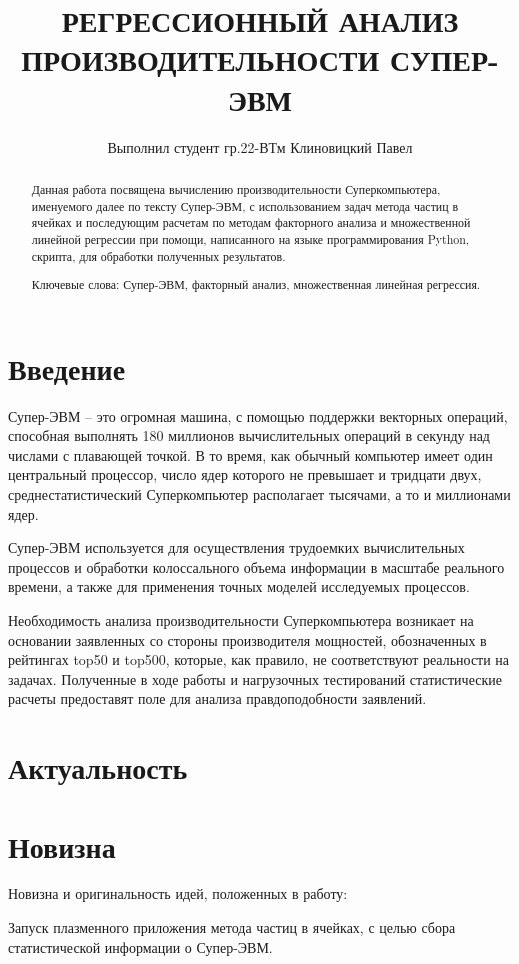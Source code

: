 \documentclass{article}
\title{РЕГРЕССИОННЫЙ АНАЛИЗ ПРОИЗВОДИТЕЛЬНОСТИ СУПЕР-ЭВМ}
\author{Выполнил студент гр.22-ВТм Клиновицкий Павел}
\begin{document}
\maketitle

\begin{abstract}
Данная работа посвящена вычислению производительности Суперкомпьютера, именуемого далее по тексту Супер-ЭВМ, с использованием задач метода частиц в ячейках и последующим расчетам по методам факторного анализа и множественной линейной регрессии при помощи, написанного на языке программирования Python, скрипта, для обработки полученных результатов.

Ключевые слова: Супер-ЭВМ, факторный анализ, множественная линейная регрессия.
\end{abstract}

\section{Введение}
Супер-ЭВМ – это огромная машина, с помощью поддержки векторных операций, способная выполнять 180 миллионов вычислительных операций в секунду над числами с плавающей точкой. В то время, как обычный компьютер имеет один центральный процессор, число ядер которого не превышает и тридцати двух, среднестатистический Суперкомпьютер располагает тысячами, а то и миллионами ядер.

Супер-ЭВМ используется для осуществления трудоемких вычислительных процессов и обработки колоссального объема информации в масштабе реального времени, а также для применения точных моделей исследуемых процессов.

Необходимость анализа производительности Суперкомпьютера возникает на основании заявленных со стороны производителя мощностей, обозначенных в рейтингах top50 и top500, которые, как правило, не соответствуют реальности на задачах. Полученные в ходе работы и нагрузочных тестирований статистические расчеты предоставят поле для анализа правдоподобности заявлений.

\section{Актуальность}

\section{Новизна}
Новизна и оригинальность идей, положенных в работу:

Запуск плазменного приложения метода частиц в ячейках, с целью сбора статистической информации о Супер-ЭВМ.
\end{document}
